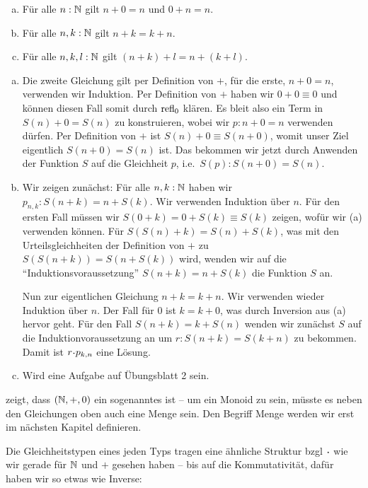 \begin{lemma}
\label{nat-wild-monoid}
\begin{enumerate}[(a)]
\item Für alle $n:\mathbb{N}$ gilt $n+0=n$ und $0+n=n$.
\item Für alle $n,k:\mathbb{N}$ gilt $n+k=k+n$.
\item Für alle $n,k,l:\mathbb{N}$ gilt $(n+k)+l=n+(k+l)$.
\end{enumerate}
\end{lemma}
\begin{beweis}
\begin{enumerate}[(a)]
\item Die zweite Gleichung gilt per Definition von $+$,
  für die erste, $n+0=n$, verwenden wir Induktion.
  Per Definition von $+$ haben wir $0+0\equiv 0$ und können diesen Fall somit durch $\mathrm{refl}_0$ klären.
  Es bleit also ein Term in $S(n)+0=S(n)$ zu konstruieren, wobei wir $ p:n+0=n$ verwenden dürfen.
  Per Definition von $+$ ist $S(n)+0\equiv S(n+0)$, womit unser Ziel eigentlich $S(n+0)=S(n)$ ist.
  Das bekommen wir jetzt durch Anwenden der Funktion $S$ auf die Gleichheit $ p$, i.e.\ $S( p):S(n+0)=S(n)$.
\item Wir zeigen zunächst: Für alle $n,k:\mathbb{N}$ haben wir $ p_{n,k} : S(n+k)=n+S(k)$.
  Wir verwenden Induktion über $n$.
  Für den ersten Fall müssen wir $S(0+k)=0+S(k)\equiv S(k)$ zeigen, wofür wir (a) verwenden können.
  Für $S(S(n)+k)=S(n)+S(k)$,
  was mit den Urteilsgleichheiten der Definition von $+$ zu $S(S(n+k))=S(n+S(k))$ wird,
  wenden wir auf die ``Induktionsvoraussetzung'' $S(n+k)=n+S(k)$ die Funktion $S$ an.

  Nun zur eigentlichen Gleichung $n+k=k+n$.
  Wir verwenden wieder Induktion über $n$.
  Der Fall für $0$ ist $k=k+0$, was durch Inversion aus (a) hervor geht.
  Für den Fall $S(n+k)=k+S(n)$ wenden wir zunächst $S$
  auf die Induktionvoraussetzung an um $ r:S(n+k)=S(k+n)$ zu bekommen.
  Damit ist $ r\kon p_{k,n}$ eine Lösung.
\item Wird eine Aufgabe auf Übungsblatt 2 sein.
\end{enumerate}
\end{beweis}

 zeigt, dass $(\mathbb{N},+,0)$ ein sogenanntes  ist -- um ein Monoid zu sein, müsste es neben den Gleichungen oben auch eine Menge sein. Den Begriff Menge werden wir erst im nächsten Kapitel definieren.

Die Gleichheitstypen eines jeden Typs tragen eine ähnliche Struktur bzgl $\kon$ wie wir gerade für $\mathbb{N}$ und $+$ gesehen haben -- bis auf die Kommutativität, dafür haben wir so etwas wie Inverse:

